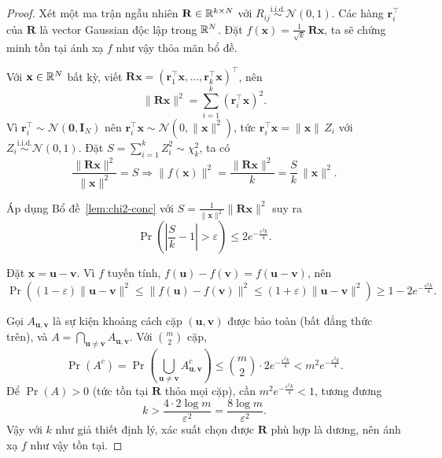 \begin{proof}
Xét một ma trận ngẫu nhiên $\mathbf{R} \in \mathbb{R}^{k \times N}$ với $R_{ij} \stackrel{\text{i.i.d.}}{\sim} \mathcal{N}(0,1)$. Các hàng $\mathbf{r}_i^\top$ của $\mathbf{R}$ là vector Gaussian độc lập trong $\mathbb{R}^N$. 
Đặt $f(\mathbf{x}) = \frac{1}{\sqrt{k}}\,\mathbf{R}\mathbf{x}$, ta sẽ chứng minh tồn tại ánh xạ $f$ như vậy thỏa mãn bổ đề.  

Với $\mathbf{x} \in \mathbb{R}^N$ bất kỳ, viết $\mathbf{R}\mathbf{x} = (\mathbf{r}_1^\top\mathbf{x}, \ldots, \mathbf{r}_k^\top\mathbf{x})^\top$, nên
\[
\|\mathbf{R}\mathbf{x}\|^2 = \sum_{i=1}^k (\mathbf{r}_i^\top \mathbf{x})^2.
\]
Vì $\mathbf{r}_i^\top \sim \mathcal{N}(\mathbf{0}, \mathbf{I}_N)$ nên $\mathbf{r}_i^\top\mathbf{x} \sim \mathcal{N}(0, \|\mathbf{x}\|^2)$, tức $\mathbf{r}_i^\top\mathbf{x} = \|\mathbf{x}\|\, Z_i$ với $Z_i \stackrel{\text{i.i.d.}}{\sim} \mathcal{N}(0,1)$. Đặt $S = \sum_{i=1}^k Z_i^2 \sim \chi^2_k$, ta có
\[
\frac{\|\mathbf{R}\mathbf{x}\|^2}{\|\mathbf{x}\|^2} = S \Rightarrow
\|f(\mathbf{x})\|^2 = \frac{\|\mathbf{R}\mathbf{x}\|^2}{k} = \frac{S}{k}\,\|\mathbf{x}\|^2.
\]

Áp dụng Bổ đề~\ref{lem:chi2-conc} với $S = \frac{1}{\|\mathbf{x}\|^2}\|\mathbf{R}\mathbf{x}\|^2$ suy ra
\[
\Pr\!\left(\left|\frac{S}{k} - 1\right| > \varepsilon\right) \leq 2 e^{-\frac{\varepsilon^2 k}{4}}.
\]

Đặt $\mathbf{x} = \mathbf{u} - \mathbf{v}$. Vì $f$ tuyến tính, $f(\mathbf{u}) - f(\mathbf{v}) = f(\mathbf{u}-\mathbf{v})$, nên
\[
\Pr\!\left(
(1-\varepsilon)\|\mathbf{u}-\mathbf{v}\|^2
\leq \|f(\mathbf{u}) - f(\mathbf{v})\|^2
\leq (1+\varepsilon)\|\mathbf{u}-\mathbf{v}\|^2
\right) \geq 1 - 2 e^{-\frac{\varepsilon^2 k}{4}}.
\]

Gọi $A_{\mathbf{u},\mathbf{v}}$ là sự kiện khoảng cách cặp $(\mathbf{u},\mathbf{v})$ được bảo toàn (bất đẳng thức trên), và $A = \bigcap_{\mathbf{u} \neq \mathbf{v}} A_{\mathbf{u},\mathbf{v}}$. Với $\binom{m}{2}$ cặp,
\[
\Pr(A^c) = \Pr\!\left(\bigcup_{\mathbf{u} \neq \mathbf{v}} A_{\mathbf{u},\mathbf{v}}^c\right)
\leq \binom{m}{2} \cdot 2 e^{-\frac{\varepsilon^2 k}{4}}
< m^2 e^{-\frac{\varepsilon^2 k}{4}}.
\]
Để $\Pr(A) > 0$ (tức tồn tại $\mathbf{R}$ thỏa mọi cặp), cần $m^2 e^{-\frac{\varepsilon^2 k}{4}} < 1$, tương đương
\[
k > \frac{4 \cdot 2 \log m}{\varepsilon^2} = \frac{8 \log m}{\varepsilon^2}.
\]
Vậy với $k$ như giả thiết định lý, xác suất chọn được $\mathbf{R}$ phù hợp là dương, nên ánh xạ $f$ như vậy tồn tại.
\end{proof}

